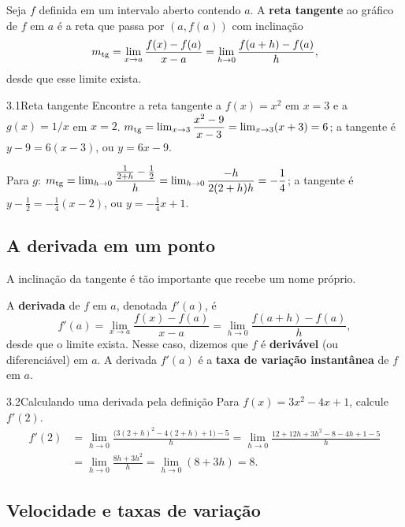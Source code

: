\begin{definicao}
Seja $f$ definida em um intervalo aberto contendo $a$. A \textbf{reta tangente} ao gráfico
de $f$ em $a$ é a reta que passa por $(a,f(a))$ com inclinação
\[
m_{\operatorname{tg}}=\lim_{x\to a}\frac{f(x)-f(a)}{x-a}=\lim_{h\to0}\frac{f(a+h)-f(a)}{h},
\]
desde que esse limite exista.
\end{definicao}

\begin{exemplo}{3.1}{Reta tangente}
Encontre a reta tangente a $f(x)=x^2$ em $x=3$ e a $g(x)=1/x$ em $x=2$.
\solucao
$m_{\operatorname{tg}}=\lim_{x\to3}\dfrac{x^2-9}{x-3}=\lim_{x\to3}(x+3)=6$; a tangente é
$y-9=6(x-3)$, ou $y=6x-9$.

Para $g$: $m_{\operatorname{tg}}=\lim_{h\to0}\dfrac{\frac1{2+h}-\frac12}{h}
=\lim_{h\to0}\dfrac{-h}{2(2+h)h}=-\dfrac14$; a tangente é $y-\tfrac12=-\tfrac14(x-2)$, ou
$y=-\tfrac14x+1$.
\end{exemplo}

\subsection{A derivada em um ponto}

A inclinação da tangente é tão importante que recebe um nome próprio.

\begin{definicao}
A \textbf{derivada} de $f$ em $a$, denotada $f'(a)$, é
\[
f'(a)=\lim_{x\to a}\frac{f(x)-f(a)}{x-a}=\lim_{h\to0}\frac{f(a+h)-f(a)}{h},
\]
desde que o limite exista. Nesse caso, dizemos que $f$ é \textbf{derivável} (ou
diferenciável) em $a$. A derivada $f'(a)$ é a \textbf{taxa de variação instantânea} de $f$
em $a$.
\end{definicao}

\begin{exemplo}{3.2}{Calculando uma derivada pela definição}
Para $f(x)=3x^2-4x+1$, calcule $f'(2)$.
\solucao
\begin{align*}
f'(2)&=\lim_{h\to0}\frac{\big(3(2+h)^2-4(2+h)+1\big)-5}{h}
=\lim_{h\to0}\frac{12+12h+3h^2-8-4h+1-5}{h}\\
&=\lim_{h\to0}\frac{8h+3h^2}{h}=\lim_{h\to0}(8+3h)=8.
\end{align*}
\end{exemplo}

\subsection{Velocidade e taxas de variação}

